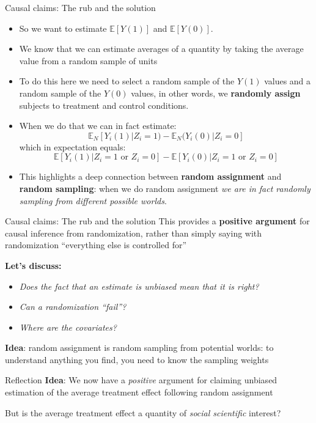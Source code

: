 \documentclass[
  11pt,
  ignorenonframetext,
]{beamer}
\providecommand{\tightlist}{%
  \setlength{\itemsep}{0pt}\setlength{\parskip}{0pt}}\usepackage{longtable,booktabs,array}
\begin{document}
\begin{frame}{Causal claims: The rub and the solution}
\protect\hypertarget{causal-claims-the-rub-and-the-solution-1}{}
\begin{itemize}
\tightlist
\item
  So we want to estimate \(\mathbb{E} [Y(1)]\) and
  \(\mathbb{E} [Y(0)]\).
\item
  We know that we can estimate averages of a quantity by taking the
  average value from a random sample of units
\item
  To do this here we need to select a random sample of the \(Y(1)\)
  values and a random sample of the \(Y(0)\) values, in other words, we
  \textbf{randomly assign} subjects to treatment and control conditions.
\item
  When we do that we can in fact estimate:
  \[ \mathbb {E}_N[Y_i(1) | Z_i = 1) - \mathbb {E}_N(Y_i(0) | Z_i = 0]\]
  which in expectation equals:
  \[ \mathbb{E} [Y_i(1) | Z_i = 1 \text{ or } Z_i = 0] - \mathbb{E} [Y_i(0) | Z_i = 1 \text{ or } Z_i = 0]\]
\item
  This highlights a deep connection between \textbf{random assignment}
  and \textbf{random sampling}: when we do random assignment \emph{we
  are in fact randomly sampling from different possible worlds}.
\end{itemize}
\end{frame}

\begin{frame}{Causal claims: The rub and the solution}
\protect\hypertarget{causal-claims-the-rub-and-the-solution-2}{}
This provides a \textbf{positive argument} for causal inference from
randomization, rather than simply saying with randomization ``everything
else is controlled for''

\textbf{Let's discuss:}

\begin{itemize}
\tightlist
\item
  \emph{Does the fact that an estimate is unbiased mean that it is
  right?}
\item
  \emph{Can a randomization ``fail''?}
\item
  \emph{Where are the covariates?}
\end{itemize}

\textbf{Idea}: random assignment is random sampling from potential
worlds: to understand anything you find, you need to know the sampling
weights
\end{frame}

\begin{frame}{Reflection}
\protect\hypertarget{reflection}{}
\textbf{Idea}: We now have a \emph{positive} argument for claiming
unbiased estimation of the average treatment effect following random
assignment

But is the average treatment effect a quantity of \emph{social
scientific} interest?
\end{frame}
\end{document}
